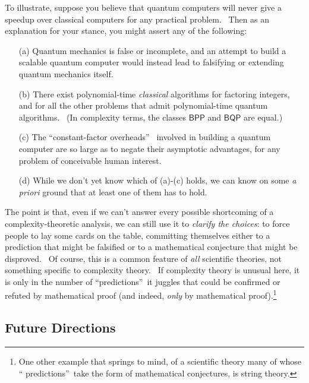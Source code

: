 \documentclass[11pt,onecolumn]{article}%
\begin{document}
To illustrate, suppose you believe that quantum computers will never give a
speedup over classical computers for any practical problem. \ Then as an
explanation for your stance, you might assert any of the following:

\begin{enumerate}
\item[(a)] Quantum mechanics is false or incomplete, and an attempt to build a
scalable quantum computer would instead lead to falsifying or extending
quantum mechanics itself.

\item[(b)] There exist polynomial-time \textit{classical} algorithms for
factoring integers, and for all the other problems that admit polynomial-time
quantum algorithms. \ (In complexity terms, the classes $\mathsf{BPP}$ and
$\mathsf{BQP}$ are equal.)

\item[(c)] The \textquotedblleft constant-factor overheads\textquotedblright%
\ involved in building a quantum computer are so large as to negate their
asymptotic advantages, for any problem of conceivable human interest.

\item[(d)] While we don't yet know which of (a)-(c) holds, we can know on some
\textit{a priori} ground that at least one of them has to hold.
\end{enumerate}

The point is that, even if we can't answer every possible shortcoming of a
complexity-theoretic analysis, we can still use it to \textit{clarify the
choices}: to force people to lay some cards on the table, committing
themselves either to a prediction that might be falsified or to a mathematical
conjecture that might be disproved. \ Of course, this is a common feature of
\textit{all} scientific theories, not something specific to complexity theory.
\ If complexity theory is unusual here, it is only in the number of
\textquotedblleft predictions\textquotedblright\ it juggles that could be
confirmed or refuted by mathematical proof (and indeed, \textit{only} by
mathematical proof).\footnote{One other example that springs to mind, of a
scientific theory many of whose \textquotedblleft
predictions\textquotedblright\ take the form of mathematical conjectures, is
string theory.}

\subsection{Future Directions\label{FUTURE}}
\end{document}
